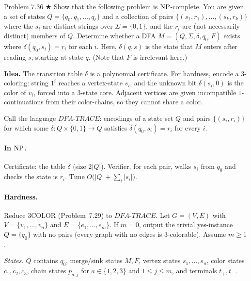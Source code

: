 \begin{question}{Problem 7.36 $\bigstar$}
Show that the following problem is $\mathrm{NP}$-complete. You are given a set of states $Q=\{q_0,q_1,\dots,q_\ell\}$ and a collection of pairs $\{(s_1,r_1),\dots,(s_k,r_k)\}$ where the $s_i$ are distinct strings over $\Sigma=\{0,1\}$, and the $r_i$ are (not necessarily distinct) members of $Q$. Determine whether a DFA $M=(Q,\Sigma,\delta,q_0,F)$ exists where $\delta(q_0,s_i)=r_i$ for each $i$. Here, $\delta(q,s)$ is the state that $M$ enters after reading $s$, starting at state $q$. (Note that $F$ is irrelevant here.)
\end{question}
\begin{soln}
\textbf{Idea.} The transition table $\delta$ is a polynomial certificate. For hardness, encode a $3$-coloring: string $1^i$ reaches a vertex-state $s_i$, and the unknown bit $\delta(s_i,0)$ is the color of $v_i$, forced into a $3$-state core. Adjacent vertices are given incompatible $1$-continuations from their color-chains, so they cannot share a color.

Call the language $\mathit{DFA\text{-}TRACE}$: encodings of a state set $Q$ and pairs $\{(s_i,r_i)\}$ for which some $\delta\colon Q\times\{0,1\}\to Q$ satisfies $\widehat{\delta}(q_0,s_i)=r_i$ for every $i$.

\paragraph{In $\mathrm{NP}$.}
Certificate: the table $\delta$ (size $2|Q|$). Verifier, for each pair, walks $s_i$ from $q_0$ and checks the state is $r_i$. Time $O\bigl(|Q|+\sum_i|s_i|\bigr)$.

\paragraph{Hardness.}
Reduce $3\mathrm{COLOR}$ (Problem~7.29) to $\mathit{DFA\text{-}TRACE}$. Let $G=(V,E)$ with $V=\{v_1,\dots,v_n\}$ and $E=\{e_1,\dots,e_m\}$. If $m=0$, output the trivial yes-instance $Q=\{q_0\}$ with no pairs (every graph with no edges is $3$-colorable). Assume $m\ge 1$.

\emph{States.} $Q$ contains $q_0$, merge/sink states $M,F$, vertex states $s_1,\dots,s_n$, color states $c_1,c_2,c_3$, chain states $p_{a,j}$ for $a\in\{1,2,3\}$ and $1\le j\le m$, and terminals $t_+,t_-$.


\end{soln}

